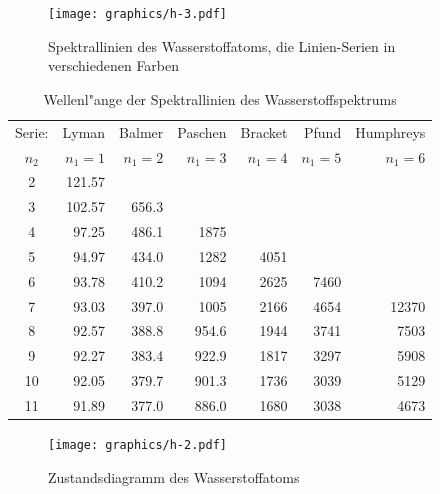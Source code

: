 \begin{figure}
\centering
\texttt{[image: graphics/h-3.pdf]}
\caption{Spektrallinien des Wasserstoffatoms, die Linien-Serien in
verschiedenen Farben
\label{skript:hspektrallinien}}
\end{figure}


\begin{table}
\begin{center}
\begin{tabular}{crrrrrr}
\hline
Serie:&  Lyman  &  Balmer & Paschen          & Bracket &  Pfund  & Humphreys \\
$n_2$ & $n_1=1$ & $n_1=2$ & $n_1=3$          & $n_1=4$ & $n_1=5$ & $n_1=6$   \\
\hline
    2 &  121.57 &         &                  &         &         &           \\
    3 &  102.57 &   656.3 &                  &         &         &           \\
    4 &   97.25 &   486.1 &  1875\phantom{.0}&         &         &           \\
    5 &   94.97 &   434.0 &  1282\phantom{.0}&  4051   &         &           \\
    6 &   93.78 &   410.2 &  1094\phantom{.0}&  2625   &   7460  &           \\
    7 &   93.03 &   397.0 &  1005\phantom{.0}&  2166   &   4654  & 12370     \\
    8 &   92.57 &   388.8 &   954.6          &  1944   &   3741  &  7503     \\
    9 &   92.27 &   383.4 &   922.9          &  1817   &   3297  &  5908     \\
   10 &   92.05 &   379.7 &   901.3          &  1736   &   3039  &  5129     \\
   11 &   91.89 &   377.0 &   886.0          &  1680   &   3038  &  4673     \\
\hline
\end{tabular}
\end{center}
\caption{Wellenl"ange der Spektrallinien des Wasserstoffspektrums
\label{skript:h2wellenlaengen}}
\end{table}

\begin{figure}
\centering
\texttt{[image: graphics/h-2.pdf]}
\caption{Zustandsdiagramm des Wasserstoffatoms
\label{skript:zustandsdiagramm}}
\end{figure}

